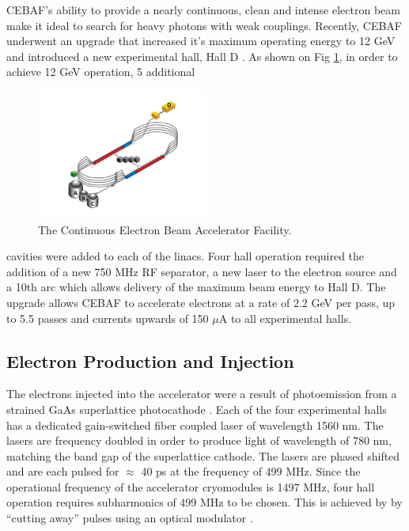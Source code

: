 CEBAF's ability to provide a nearly continuous, clean and intense electron
beam make it ideal to search for heavy photons with weak couplings. Recently,
CEBAF underwent an upgrade that increased it's maximum operating energy to 12
GeV and introduced a new experimental hall, Hall D \cite{pac.2007.4440339}. As 
shown on Fig \ref{fig:cebaf}, in order to achieve 12 GeV operation, 5 additional
\begin{figure}[h]
    \centering
    \includegraphics[width=0.5\textwidth]{images/cebaf.jpg}
    \caption{The Continuous Electron Beam Accelerator Facility.}
    \label{fig:cebaf}
\end{figure}
cavities were added to each of the linacs.  Four hall operation required the 
addition of a new 750 MHz RF separator, a new laser to the electron source and a
10th arc which allows delivery of the maximum beam energy to Hall D.  The 
upgrade allows CEBAF to accelerate electrons at a rate of 2.2 GeV per pass, up 
to 5.5 passes and currents upwards of 150 $\mu$A to all experimental halls.


\subsection{Electron Production and Injection}

The electrons injected into the accelerator were a result of photoemission from
a strained GaAs superlattice photocathode \cite{APL.2004.85.13}.  Each of the 
four experimental halls has a dedicated gain-switched fiber coupled laser of
wavelength 1560 nm.  The lasers are frequency doubled in order to produce light
of wavelength of 780 nm, matching the band gap of the superlattice cathode. The
lasers are phased shifted and are each pulsed for $\approx$ 40 ps at the 
frequency of 499 MHz.  Since the operational frequency of the accelerator 
cryomodules is 1497 MHz, four hall operation requires subharmonics of 499 MHz to
be chosen.  This is achieved by by ``cutting away'' pulses using an optical 
modulator \cite{kazimi2013source}.


